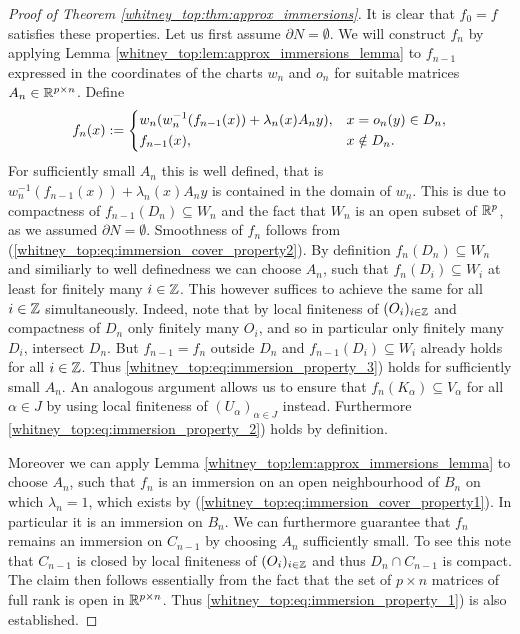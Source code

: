 \begin{proof}[Proof of Theorem \ref{whitney_top:thm:approx_immersions}]
    It is clear that $f_0 = f$ satisfies these properties. Let us first assume $\partial N = \emptyset$. We will construct $f_n$ by applying Lemma \ref{whitney_top:lem:approx_immersions_lemma} to $f_{n-1}$ expressed in the coordinates of the charts $w_n$ and $o_n$ for suitable matrices $A_n \in \mathbb{R}^{p \times n}$. Define 
    \[
    f_n(x) := \begin{dcases}
        w_n(w_n^{-1}(f_{n-1}(x)) + \lambda_n(x)A_ny), & x = o_n(y) \in D_n, \\
        f_{n-1}(x), & x \notin D_n.
    \end{dcases}
    \]
    For sufficiently small $A_n$ this is well defined, that is
    $w_n^{-1}(f_{n-1}(x)) + \lambda_n(x)A_ny$ is contained in the domain of $w_n$. This is due to compactness of $f_{n-1}(D_n) \subseteq W_n$ and the fact that $W_n$ is an open subset of $\mathbb{R}^p$, as we assumed $\partial N = \emptyset$. Smoothness of $f_n$ follows from (\ref{whitney_top:eq:immersion_cover_property2}). By definition $f_n(D_n) \subseteq W_n$ and similiarly to well definedness we can choose $A_n$, such that $f_n(D_i) \subseteq W_i$ at least for finitely many $i \in \mathbb{Z}$. This however suffices to achieve the same for all $i \in \mathbb{Z}$ simultaneously. Indeed, note that by local finiteness of $(O_i)_{i \in \mathbb{Z}}$ and compactness of $D_n$ only finitely many $O_i$, and so in particular only finitely many $D_i$, intersect $D_n$. But $f_{n-1} = f_n$ outside $D_n$ and $f_{n-1}(D_i) \subseteq W_i$ already holds for all $i \in \mathbb{Z}$. Thus \ref{whitney_top:eq:immersion_property_3}) holds for sufficiently small $A_n$. An analogous argument allows us to ensure that $f_n(K_\alpha) \subseteq V_\alpha$ for all $\alpha \in J$ by using local finiteness of $(U_\alpha)_{\alpha \in J}$ instead. Furthermore \ref{whitney_top:eq:immersion_property_2}) holds by definition.
    
    Moreover we can apply Lemma \ref{whitney_top:lem:approx_immersions_lemma} to choose $A_n$, such that $f_n$ is an immersion on an open neighbourhood of $B_n$ on which $\lambda_n = 1$, which exists by (\ref{whitney_top:eq:immersion_cover_property1}). In particular it is an immersion on $B_n$. We can furthermore guarantee that $f_n$ remains an immersion on $C_{n-1}$ by choosing $A_n$ sufficiently small. To see this note that $C_{n-1}$ is closed by local finiteness of $(O_i)_{i \in \mathbb{Z}}$ and thus $D_n \cap C_{n-1}$ is compact. The claim then follows essentially from the fact that the set of $p \times n$ matrices of full rank is open in $\mathbb{R}^{p \times n}$. Thus \ref{whitney_top:eq:immersion_property_1}) is also established.


\end{proof}
